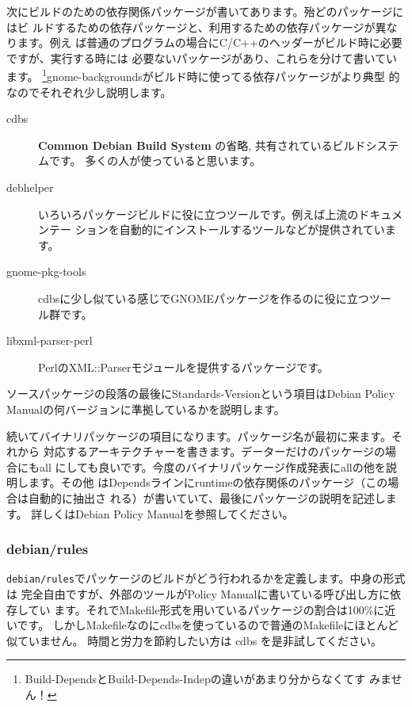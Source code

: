 \documentclass[mingoth,a4paper]{jsarticle}
\begin{document}
次にビルドのための依存関係パッケージが書いてあります。殆どのパッケージにはビ
ルドするための依存パッケージと、利用するための依存パッケージが異なります。例え
ば普通のプログラムの場合にC/C++のヘッダーがビルド時に必要ですが、実行する時には
必要ないパッケージがあり、これらを分けて書いています。
\footnote{Build-DependsとBuild-Depends-Indepの違いがあまり分からなくてす
みません！}gnome-backgroundsがビルド時に使ってる依存パッケージがより典型
的なのでそれぞれ少し説明します。

\begin{description}
 \item[cdbs]
            {\bf Common Debian Build System} の省略, 共有されているビルドシステムです。
            多くの人が使っていると思います。
 \item[debhelper]
            いろいろパッケージビルドに役に立つツールです。例えば上流のドキュメンテー
            ションを自動的にインストールするツールなどが提供されています。
 \item[gnome-pkg-tools]
            cdbsに少し似ている感じでGNOMEパッケージを作るのに役に立つツー
            ル群です。
 \item[libxml-parser-perl]
            PerlのXML::Parserモジュールを提供するパッケージです。
\end{description}

ソースパッケージの段落の最後にStandards-Versionという項目はDebian
Policy Manualの何バージョンに準拠しているかを説明します。

続いてバイナリパッケージの項目になります。パッケージ名が最初に来ます。それから
対応するアーキテクチャーを書きます。データーだけのパッケージの場合にもall
にしても良いです。今度のバイナリパッケージ作成発表にallの他を説明します。その他
はDependsラインにruntimeの依存関係のパッケージ（この場合は自動的に抽出さ
れる）が書いていて、最後にパッケージの説明を記述します。
詳しくはDebian Policy Manualを参照してください。

\subsubsection{debian/rules}

\texttt{debian/rules}でパッケージのビルドがどう行われるかを定義します。中身の形式は
完全自由ですが、外部のツールがPolicy Manualに書いている呼び出し方に依存してい
ます。それでMakefile形式を用いているパッケージの割合は100\%に近いです。
しかしMakefileなのにcdbsを使っているので普通のMakefileにほとんど似ていません。
時間と労力を節約したい方は cdbs を是非試してください。
\end{document}
